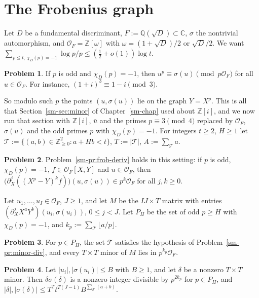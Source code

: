 \documentclass[reqno]{amsart}
\newcounter{chap}
\theoremstyle{definition}
\newtheorem{problem}{Problem}[section]
\theoremstyle{plain}
\newcommand{\Z}{\mathbb{Z}}
\newcommand{\Q}{\mathbb{Q}}
\newcommand{\C}{\mathbb{C}}
\newcommand{\OF}{\mathcal{O}_F}
\newcommand{\T}{\mathcal{T}}
\begin{document}
\section{The Frobenius graph}\label{sec:graph}

Let \(D\) be a fundamental discriminant, \(F := \Q(\sqrt D) \subset \C\), \(\sigma\) the nontrivial automorphism, and \(\OF = \Z[\omega]\) with \(\omega = (1 + \sqrt D)/2\) or \(\sqrt D/2\).  We want \(\sum_{p \le t,\, \chi_D(p) = -1} \log p/p \le (\frac12 + o(1)) \log t\).

\begin{problem}\label{pr:frob}
If \(p\) is odd and \(\chi_D(p) = -1\), then \(u^p \equiv \sigma(u) \pmod{p\OF}\) for all \(u \in \OF\).  For instance, \((1 + i)^3 \equiv 1 - i \pmod 3\).
\end{problem}

So modulo such \(p\) the points \((u, \sigma(u))\) lie on the graph \(Y = X^p\).  This is all that Section~\ref{sm-sec:minor} of Chapter~\ref{sm-chap} used about \(\Z[i]\), and we now run that section with \(\Z[i]\), \(\bar u\) and the primes \(p \equiv 3 \pmod 4\) replaced by \(\OF\), \(\sigma(u)\) and the odd primes \(p\) with \(\chi_D(p) = -1\).  For integers \(t \ge 2\), \(H \ge 1\) let \(\T := \{(a, b) \in \Z_{\ge 0}^2 : a + Hb < t\}\), \(T := \lvert \T \rvert\), \(A := \sum_\T a\).

\begin{problem}\label{pr:jet-div}
Problem~\ref{sm-pr:frob-deriv} holds in this setting: if \(p\) is odd, \(\chi_D(p) = -1\), \(f \in \OF[X, Y]\) and \(u \in \OF\), then \(\bigl(\partial_X^j ((X^p - Y)^k f)\bigr)(u, \sigma(u)) \in p^k \OF\) for all \(j, k \ge 0\).
\end{problem}

Let \(u_1, \dots, u_I \in \OF\), \(J \ge 1\), and let \(M\) be the \(IJ \times T\) matrix with entries \((\partial_X^j X^a Y^b)(u_i, \sigma(u_i))\), \(0 \le j < J\).  Let \(P_H\) be the set of odd \(p \ge H\) with \(\chi_D(p) = -1\), and \(k_p := \sum_\T \lfloor a/p \rfloor\).

\begin{problem}\label{pr:minor-div}
For \(p \in P_H\), the set \(\T\) satisfies the hypothesis of Problem~\ref{sm-pr:minor-div}, and every \(T \times T\) minor of \(M\) lies in \(p^{k_p} \OF\).
\end{problem}

\begin{problem}\label{pr:norm}
Let \(\lvert u_i \rvert, \lvert \sigma(u_i) \rvert \le B\) with \(B \ge 1\), and let \(\delta\) be a nonzero \(T \times T\) minor.  Then \(\delta\sigma(\delta)\) is a nonzero integer divisible by \(p^{2k_p}\) for \(p \in P_H\), and \(\lvert \delta \rvert, \lvert \sigma(\delta) \rvert \le T^T t^{T(J-1)} B^{\sum_\T (a + b)}\).
\end{problem}
\end{document}
